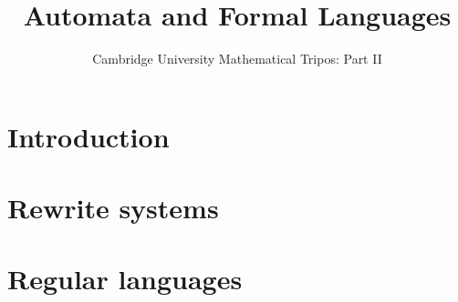 \documentclass{article}
\title{Automata and Formal Languages}
\author{Cambridge University Mathematical Tripos: Part II}
\begin{document}
\maketitle

\tableofcontentsnewpage{}

\section{Introduction}

\section{Rewrite systems}

\section{Regular languages}

\end{document}

